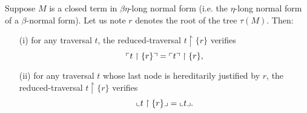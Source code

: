 \begin{lem}
\label{lem:redtrav_trav} Suppose $M$ is a closed term in $\beta
\eta$-long normal form (i.e. the $\eta$-long normal form of a
$\beta$-normal form). Let us note $r$ denotes the root of the tree
$\tau(M)$. Then:
\begin{itemize}
\item[(i)] for any traversal $t$, the reduced-traversal $t \upharpoonright \{ r \}$ verifies
$$ \ulcorner t \upharpoonright \{ r \} \urcorner = \ulcorner t \urcorner \upharpoonright \{ r \},$$
\item[(ii)] for any traversal $t$ whose last node is hereditarily justified by $r$,
     the reduced-traversal $t \upharpoonright \{ r \}$ verifies
    $$ \llcorner t \upharpoonright \{ r \} \lrcorner = \llcorner t \lrcorner.$$
\end{itemize}
\end{lem}

